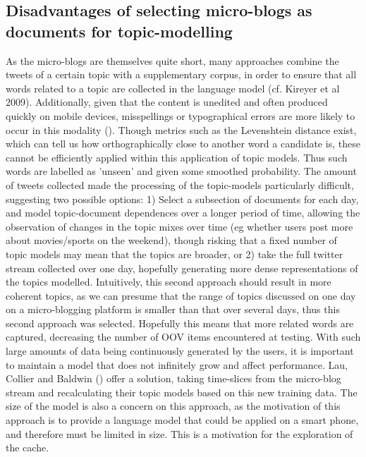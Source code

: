 \documentclass{article}
\begin{document}
\subsection{Disadvantages of selecting micro-blogs as documents for topic-modelling}
As the micro-blogs are themselves quite short, many approaches combine the tweets of a certain topic with a supplementary corpus, in order to ensure that all words related to a topic are collected in the language model (cf. Kireyer et al 2009).
Additionally, given that the content is unedited and often produced quickly on mobile devices, misspellings or typographical errors are more likely to occur in this modality (). Though metrics such as the Levenshtein distance exist, which can tell us how orthographically close to another word a candidate is, these cannot be efficiently applied within this application of topic models. Thus such words are labelled as 'unseen' and given some smoothed probability.
The amount of tweets collected made the processing of the topic-models particularly difficult, suggesting two possible options: 1) Select a subsection of documents for each day, and model topic-document dependences over a longer period of time, allowing the observation of changes in the topic mixes over time (eg whether users post more about movies/sports on the weekend), though risking that a fixed number of topic models may mean that the topics are broader, or 2) take the full twitter stream collected over one day, hopefully generating more dense representations of the topics modelled. 
Intuitively, this second approach should result in more coherent topics, as we can presume that the range of topics discussed on one day on a micro-blogging platform is smaller than that over several days, thus this second approach was selected. Hopefully this means that more related words are captured, decreasing the number of OOV items encountered at testing.
With such large amounts of data being continuously generated by the users, it is important to maintain a model that does not infinitely grow and affect performance. Lau, Collier and Baldwin () offer a solution, taking time-slices from the micro-blog stream and recalculating their topic models based on this new training data. The size of the model is also a concern on this approach, as the motivation of this approach is to provide a language model that could be applied on a smart phone, and therefore must be limited in size. This is a motivation for the exploration of the cache.

\FloatBarrier
\end{document}
